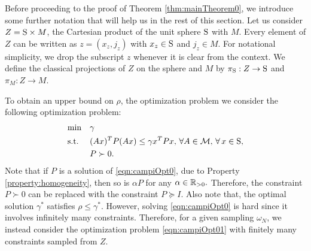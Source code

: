

Before proceeding to the proof of Theorem \ref{thm:mainTheorem0}, we introduce some further notation that will help us in the rest of this section. Let us consider $Z = \text{S} \times M$, the Cartesian product of the unit sphere $\text{S}$ with $M$. Every element of $Z$ can be written as $z = (x_z, j_z)$ with $x_z \in \text{S}$ and $j_z \in M$. For notational simplicity, we drop the subscript $z$ whenever it is clear from the context. We define the classical projections of $Z$ on the sphere and $M$ by $\pi_{\text{S}}: Z \to \text{S}$ and $\pi_M: Z \to M$.

To obtain an upper bound on $\rho$, the optimization problem we consider the following optimization problem:
\begin{equation}\label{eqn:campiOpt0}
\begin{aligned}
& \text{min} & & \gamma \\
& \text{s.t.} 
&  & (Ax)^TP(Ax) \leq \gamma x^TPx,\,\forall A \in \mathcal{M}, \,\forall\, x \in \text{S},\\
& && P \succ 0. \\
\end{aligned}
\end{equation}
Note that if $P$ is a solution of \eqref{eqn:campiOpt0}, due to Property \ref{property:homogeneity}, then so is $\alpha P$ for any $\alpha \in \mathbb{R}_{> 0}.$ Therefore, the constraint $P \succ 0$ can be replaced with the constraint $P \succeq I$. Also note that, the optimal solution $\gamma^*$ satisfies $\rho \leq \gamma^*$. However, solving \eqref{eqn:campiOpt0} is hard since it involves infinitely many constraints. Therefore, for a given sampling $\omega_N$, we instead consider the optimization problem \eqref{eqn:campiOpt01} with finitely many constraints sampled from $Z$.


